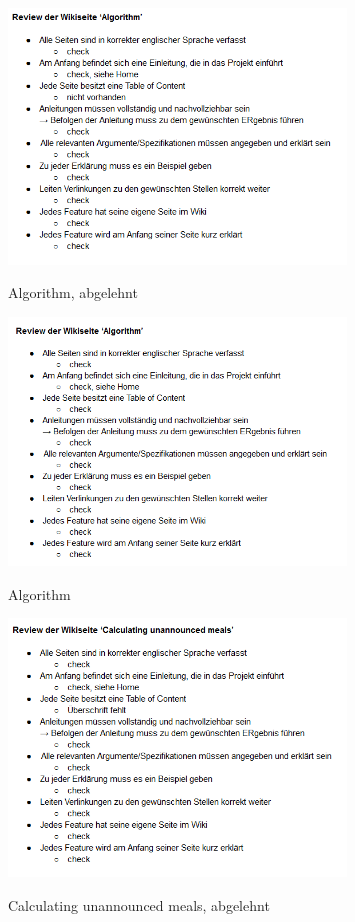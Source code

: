 \documentclass[accentcolor=tud0b,12pt,paper=a4]{tudreport}
\begin{document}
\begin{figure}[h]
\centering
\caption{Algorithm, abgelehnt}
\includegraphics[width=0.8\textwidth]{wiki2}
\label{wiki2}
\end{figure}

\begin{figure}[h]
\centering
\caption{Algorithm}
\includegraphics[width=0.8\textwidth]{wiki3}
\label{wiki3}
\end{figure}

\begin{figure}[h]
\centering
\caption{Calculating unannounced meals, abgelehnt}
\includegraphics[width=0.8\textwidth]{wiki4}
\label{wiki4}
\end{figure}
\end{document}
